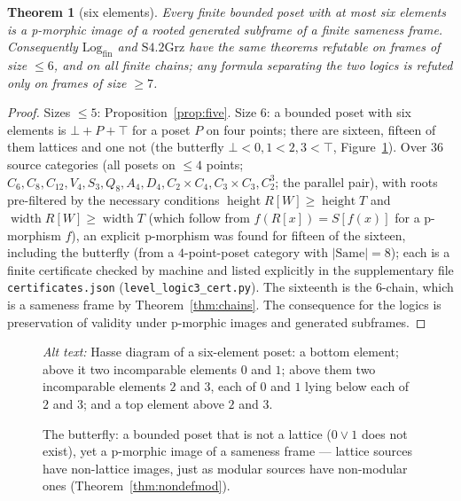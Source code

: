 \documentclass[11pt]{amsart}
\newtheorem{thm}{Theorem}[section]
\theoremstyle{definition}
\newcommand{\Same}{\mathrm{Same}}
\newcommand{\Log}{\mathrm{Log}}
\DeclareMathOperator{\wid}{width}
\DeclareMathOperator{\hgt}{height}
\begin{document}
\begin{thm}[six elements]\label{thm:six}
Every finite bounded poset with at most six elements is a p-morphic image of a
rooted generated subframe of a finite sameness frame. Consequently
$\Log_{\mathrm{fin}}$ and $\mathrm{S4.2Grz}$ have the same theorems refutable on
frames of size $\le6$, and on all finite chains; any formula separating the two
logics is refuted only on frames of size $\ge7$.
\end{thm}
\begin{proof}
Sizes $\le5$: Proposition~\ref{prop:five}. Size $6$: a bounded poset with six
elements is $\bot+P+\top$ for a poset $P$ on four points; there are sixteen,
fifteen of them lattices and one not (the butterfly $\bot<0,1<2,3<\top$,
Figure~\ref{fig:butterfly}). Over $36$ source categories (all posets on $\le4$
points; $C_6,C_8,C_{12},V_4,S_3,Q_8,A_4,D_4,C_2\times C_4,C_3\times C_3,C_2^3$;
the parallel pair), with roots pre-filtered by the necessary conditions
$\hgt R[W]\ge\hgt T$ and $\wid R[W]\ge\wid T$ (which follow from
$f(R[x])=S[f(x)]$ for a p-morphism $f$), an explicit p-morphism was found for
fifteen of the sixteen, including the butterfly (from a $4$-point-poset
category with $|\Same|=8$); each is a finite certificate checked by machine and
listed explicitly in the supplementary file \texttt{certificates.json}
(\texttt{level\_logic3\_cert.py}). The sixteenth is the $6$-chain, which is a
sameness frame by Theorem~\ref{thm:chains}. The consequence for the logics is
preservation of validity under p-morphic images and generated subframes.
\end{proof}

\begin{figure}[ht]
\centering
{}
\caption{The butterfly: a bounded poset that is not a lattice ($0\vee1$ does
not exist), yet a p-morphic image of a sameness frame --- lattice sources have
non-lattice images, just as modular sources have non-modular ones
(Theorem~\ref{thm:nondefmod}).}
\label{fig:butterfly}
\par\smallskip\noindent\textit{Alt text:} Hasse diagram of a six-element poset: a bottom element; above it two
incomparable elements $0$ and $1$; above them two incomparable elements $2$
and $3$, each of $0$ and $1$ lying below each of $2$ and $3$; and a top
element above $2$ and $3$.
\end{figure}
\end{document}
